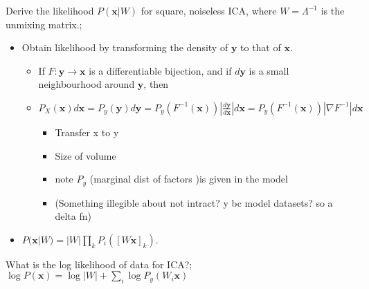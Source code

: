 \documentclass{article}
\begin{document}
Derive the likelihood $P(\mathbf{x}|W)$ for square, noiseless ICA, where $W=\Lambda^{-1}$ is the unmixing matrix.; \begin{itemize}
    \item Obtain likelihood by transforming the density of $\mathbf{y}$ to that of $\mathbf{x}$.
    \begin{itemize}
        \item If $F:\mathbf{y}\to\mathbf{x}$ is a differentiable bijection, and if $d\mathbf{y}$ is a small neighbourhood around $\mathbf{y}$, then
        \item $P_X(\mathbf{x})d\mathbf{x}=P_y(\mathbf{y})d\mathbf{y}=P_y(F^{-1}(\mathbf{x}))|\frac{d\mathbf{y}}{d\mathbf{x}}|d\mathbf{x}=P_y(F^{-1}(\mathbf{x}))|\nabla F^{-1}|d\mathbf{x}$
        \begin{itemize}
            \item Transfer x to y
            \item Size of volume 
            \item note $P_y$ (marginal dist of factors )is given in the model
            \item (Something illegible about not intract? y bc model datasets? so a delta fn)
        \end{itemize}
    \end{itemize}
    \item $P(\mathbf{x}|W)=|W|\prod_kP_i([W\mathbf{x}]_k)$.
\end{itemize}

What is the log likelihood of data for ICA?; $\log P(\mathbf{x})=\log|W|+\sum_i \log P_y(W_i\mathbf{x})$
\end{document}
